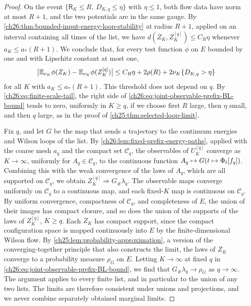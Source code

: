 \begin{proof}
On the event $\{\mathsf R_K\le R,\ D_{K,q}\le\eta\}$ with $\eta\le1$, both flow data have norm at most $R+1$, and the two potentials are in the same gauge. By \cref{ch26:thm:bounded-input-energy-loop-stability} at radius $R+1$, applied on an interval containing all times of the list, we have $d(Z_K,Z_K^{[q]})\le C_R\eta$ whenever $a_K\le a_*(R+1)$. We conclude that, for every test function $\phi$ on $E$ bounded by one and with Lipschitz constant at most one,
\begin{equation}\label{ch26:eq:joint-observable-prefix-BL-bound}
 \bigl\lvert\mathbb E_{\nu_K}\phi(Z_K)-\mathbb E_{\nu_K}\phi(Z_K^{[q]})\bigr\rvert\le C_R\eta+2\rho(R)+2\nu_K\{D_{K,q}>\eta\}
\end{equation}
for all $K$ with $a_K\le a_*(R+1)$. This threshold does not depend on $q$. By \eqref{ch26:eq:finite-scale-tail}, the right side of \eqref{ch26:eq:joint-observable-prefix-BL-bound} tends to zero, uniformly in $K\ge q$, if we choose first $R$ large, then $\eta$ small, and then $q$ large, as in the proof of \cref{ch25:thm:selected-loop-limit}.

Fix $q$, and let $G$ be the map that sends a trajectory to the continuum energies and Wilson loops of the list. By \cref{ch26:lem:fixed-prefix-energy-paths}, applied with the coarse mesh $a_q$ and the compact set $\mathcal C_q$, the observables of $U_K^{[q]}$ converge as $K\to\infty$, uniformly for $A_q\in\mathcal C_q$, to the continuous function $A_q\mapsto G(t\mapsto\Phi_t[f_q])$. Combining this with the weak convergence of the laws of $A_q$, which are all supported on $\mathcal C_q$, we obtain $Z_K^{[q]}\Rightarrow G_\#\lambda_q$. The observable maps converge uniformly on $\mathcal C_q$ to a continuous map, and each fixed-$K$ map is continuous on $\mathcal C_q$. By uniform convergence, compactness of $\mathcal C_q$, and completeness of $E$, the union of their images has compact closure, and so does the union of the supports of the laws of $Z_K^{[q]}$, $K\ge q$. Each $Z_K$ has compact support, since the compact configuration space is mapped continuously into $E$ by the finite-dimensional Wilson flow. By \cref{ch25:lem:probability-approximation}, a version of the converging-together principle \cite[Theorem 3.2]{Billingsley1999} that also constructs the limit, the laws of $Z_K$ converge to a probability measure $\rho_G$ on $E$. Letting $K\to\infty$ at fixed $q$ in \eqref{ch26:eq:joint-observable-prefix-BL-bound}, we find that $G_\#\lambda_q\to\rho_G$ as $q\to\infty$. The argument applies to every finite list, and in particular to the union of any two lists. The limits are therefore consistent under unions and projections, and we never combine separately obtained marginal limits.


\end{proof}

